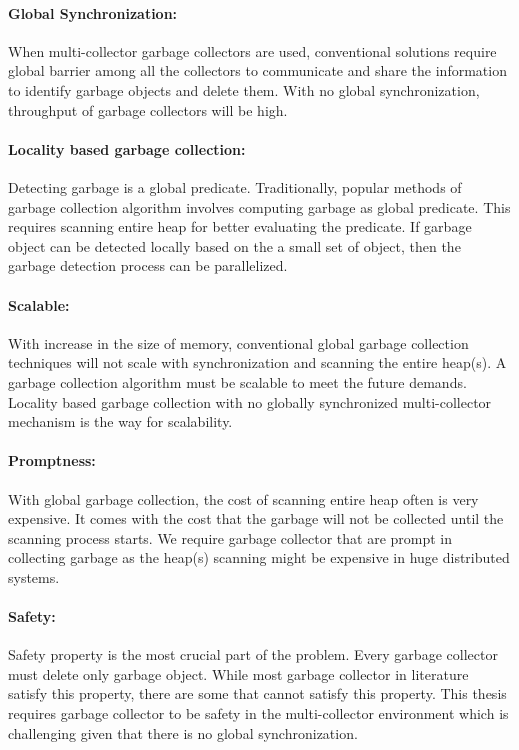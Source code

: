 \paragraph{Global Synchronization:}
	When multi-collector garbage collectors are used, conventional solutions require global barrier among all the collectors to communicate and share the information to identify garbage objects and delete them. With no global synchronization, throughput of garbage collectors will be high.
\paragraph{Locality based garbage collection:}
	Detecting garbage is a global predicate. Traditionally, popular methods of garbage collection algorithm involves computing garbage as global predicate. This requires scanning entire heap for better evaluating the predicate. If garbage object can be detected locally based on the a small set of object, then the garbage detection process can be parallelized.
\paragraph{Scalable:}
	With increase in the size of memory, conventional global garbage collection techniques will not scale with synchronization and scanning the entire heap(s). A garbage collection algorithm must be scalable to meet the future demands. Locality based garbage collection with no globally synchronized multi-collector mechanism is the way for scalability.
\paragraph{Promptness:}
	With global garbage collection, the cost of scanning entire heap often is very expensive. It comes with the cost that the garbage will not be collected until the scanning process starts. We require garbage collector that are prompt in collecting garbage as the heap(s) scanning might be expensive in huge distributed systems.
\paragraph{Safety:}
	Safety property is the most crucial part of the problem. Every garbage collector must delete only garbage object. While most garbage collector in literature satisfy this property, there are some that cannot satisfy this property. This thesis requires garbage collector to be safety in the multi-collector environment which is challenging given that there is no global synchronization.
